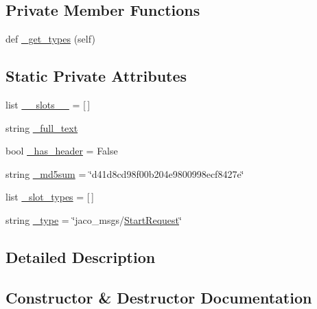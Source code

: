 \subsection*{Private Member Functions}
\begin{DoxyCompactItemize}
\item 
def \hyperlink{classjaco__msgs_1_1srv_1_1__Start_1_1StartRequest_a2d64e502dcd586a93da3e677ecac91a3}{\+\_\+get\+\_\+types} (self)
\end{DoxyCompactItemize}
\subsection*{Static Private Attributes}
\begin{DoxyCompactItemize}
\item 
list \hyperlink{classjaco__msgs_1_1srv_1_1__Start_1_1StartRequest_ae4c9ff821237faae7bd9938ca151509c}{\+\_\+\+\_\+slots\+\_\+\+\_\+} = \mbox{[}$\,$\mbox{]}
\item 
string \hyperlink{classjaco__msgs_1_1srv_1_1__Start_1_1StartRequest_a7c2b508a46d65bd9d9333dfd0f97258b}{\+\_\+full\+\_\+text}
\item 
bool \hyperlink{classjaco__msgs_1_1srv_1_1__Start_1_1StartRequest_a4009d8d7e45440597c9b71ce05e1974b}{\+\_\+has\+\_\+header} = False
\item 
string \hyperlink{classjaco__msgs_1_1srv_1_1__Start_1_1StartRequest_ae5f1b3824e2164a21e656114cfc72fb8}{\+\_\+md5sum} = \char`\"{}d41d8cd98f00b204e9800998ecf8427e\char`\"{}
\item 
list \hyperlink{classjaco__msgs_1_1srv_1_1__Start_1_1StartRequest_a0fc9f81638c4647f695ef36a4300da59}{\+\_\+slot\+\_\+types} = \mbox{[}$\,$\mbox{]}
\item 
string \hyperlink{classjaco__msgs_1_1srv_1_1__Start_1_1StartRequest_ae3aa3a437ec579042f0a69a5cbe3a472}{\+\_\+type} = \char`\"{}jaco\+\_\+msgs/\hyperlink{classjaco__msgs_1_1srv_1_1__Start_1_1StartRequest}{Start\+Request}\char`\"{}
\end{DoxyCompactItemize}


\subsection{Detailed Description}


\subsection{Constructor \& Destructor Documentation}
